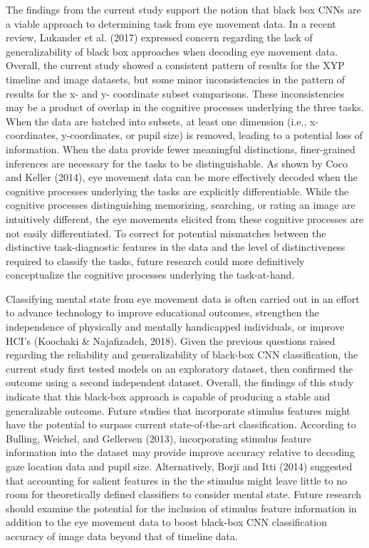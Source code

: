 \documentclass[
  english,
  man,floatsintext]{apa6}
\begin{document}
The findings from the current study support the notion that black box CNNs are a viable approach to determining task from eye movement data. In a recent review, Lukander et al. (2017) expressed concern regarding the lack of generalizability of black box approaches when decoding eye movement data. Overall, the current study showed a consistent pattern of results for the XYP timeline and image datasets, but some minor inconsistencies in the pattern of results for the x- and y- coordinate subset comparisons. These inconsistencies may be a product of overlap in the cognitive processes underlying the three tasks. When the data are batched into subsets, at least one dimension (i.e., x-coordinates, y-coordinates, or pupil size) is removed, leading to a potential loss of information. When the data provide fewer meaningful distinctions, finer-grained inferences are necessary for the tasks to be distinguishable. As shown by Coco and Keller (2014), eye movement data can be more effectively decoded when the cognitive processes underlying the tasks are explicitly differentiable. While the cognitive processes distinguishing memorizing, searching, or rating an image are intuitively different, the eye movements elicited from these cognitive processes are not easily differentiated. To correct for potential mismatches between the distinctive task-diagnostic features in the data and the level of distinctiveness required to classify the tasks, future research could more definitively conceptualize the cognitive processes underlying the task-at-hand.

Classifying mental state from eye movement data is often carried out in an effort to advance technology to improve educational outcomes, strengthen the independence of physically and mentally handicapped individuals, or improve HCI's (Koochaki \& Najafizadeh, 2018). Given the previous questions raised regarding the reliability and generalizability of black-box CNN classification, the current study first tested models on an exploratory dataset, then confirmed the outcome using a second independent dataset. Overall, the findings of this study indicate that this black-box approach is capable of producing a stable and generalizable outcome. Future studies that incorporate stimulus features might have the potential to surpass current state-of-the-art classification. According to Bulling, Weichel, and Gellersen (2013), incorporating stimulus feature information into the dataset may provide improve accuracy relative to decoding gaze location data and pupil size. Alternatively, Borji and Itti (2014) suggested that accounting for salient features in the the stimulus might leave little to no room for theoretically defined classifiers to consider mental state. Future research should examine the potential for the inclusion of stimulus feature information in addition to the eye movement data to boost black-box CNN classification accuracy of image data beyond that of timeline data.
\end{document}

